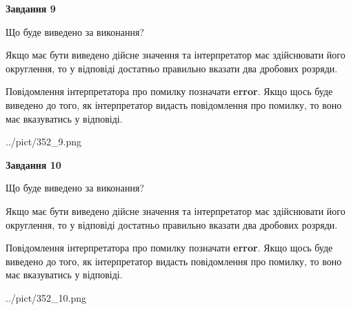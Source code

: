 \documentclass[12pt, ukrainian]{article}
\begin{document}
{\begin {Large}
{\begin {center}\textbf{Завдання 9}\end {center}}\par
Що буде виведено за виконання? \par

Якщо має бути виведено дійсне значення та інтерпретатор має здійснювати його округлення, 
то у відповіді достатньо правильно вказати два дробових розряди.

Повідомлення інтерпретатора про помилку позначати \textbf{error}.
Якщо щось буде виведено до того, як інтерпретатор видасть повідомлення про помилку, 
то воно має вказуватись у відповіді. \par

\begin{center}
	{../pict/352_9.png}
\end{center}
\newpage

{\begin {center}\textbf{Завдання 10}\end {center}}\par
Що буде виведено за виконання? \par

Якщо має бути виведено дійсне значення та інтерпретатор має здійснювати його округлення, 
то у відповіді достатньо правильно вказати два дробових розряди.

Повідомлення інтерпретатора про помилку позначати \textbf{error}.
Якщо щось буде виведено до того, як інтерпретатор видасть повідомлення про помилку, 
то воно має вказуватись у відповіді. \par

\begin{center}
	{../pict/352_10.png}
\end{center}
\newpage

\end {Large}}
\end{document}
